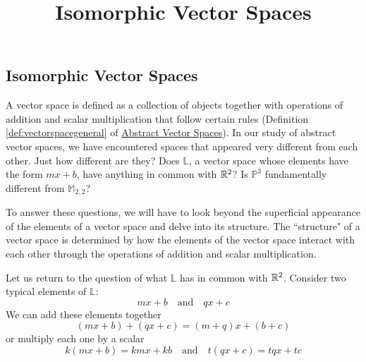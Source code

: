 \documentclass{ximera}
\title{Isomorphic Vector Spaces} \license{CC BY-NC-SA 4.0}
\begin{document}
\begin{abstract}
\end{abstract}
\maketitle

\begin{onlineOnly}
\section*{Isomorphic Vector Spaces}
\end{onlineOnly}

A vector space is defined as a collection of objects together with operations of addition and scalar multiplication that follow certain rules (Definition \ref{def:vectorspacegeneral} of \href{https://ximera.osu.edu/oerlinalg/LinearAlgebra/VSP-0050/main}{Abstract Vector Spaces}).  In our study of abstract vector spaces, we have encountered spaces that appeared very different from each other.  Just how different are they?  Does $\mathbb{L}$, a vector space whose elements have the form $mx+b$, have anything in common with $\mathbb{R}^2$?  Is $\mathbb{P}^3$ fundamentally different from $\mathbb{M}_{2,2}$?

To answer these questions, we will have to look beyond the superficial appearance of the elements of a vector space and delve into its structure.  The ``structure" of a vector space is determined by how the elements of the vector space interact with each other through the operations of addition and scalar multiplication.  

Let us return to the question of what $\mathbb{L}$ has in common with $\mathbb{R}^2$.  Consider two typical elements of $\mathbb{L}$:
\begin{equation}\label{eq:iso1}
    mx+b\quad\text{and}\quad qx+c
\end{equation}
We can add these elements together
\begin{equation}\label{eq:iso2}
(mx+b)+(qx+c)=(m+q)x+(b+c)\end{equation}
or multiply each one by a scalar
\begin{equation}\label{eq:iso3}
k(mx+b)=kmx+kb\quad\text{and}\quad t(qx+c)=tqx+tc\end{equation}
\end{document}

